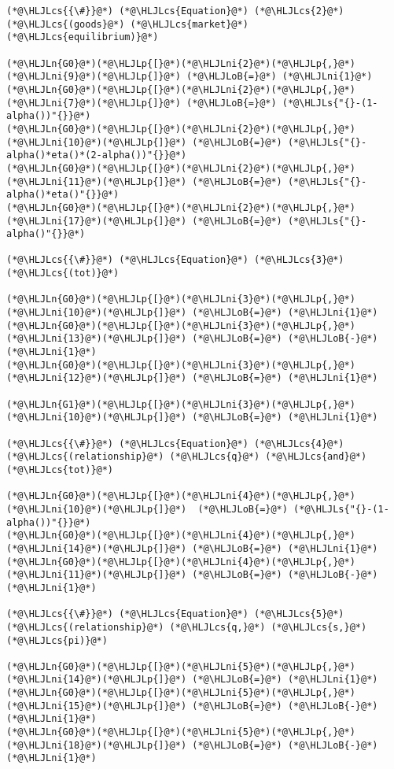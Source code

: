 \documentclass[12pt,a4paper]{article}
\newcommand{\HLJLn}[1]{#1}
\newcommand{\HLJLs}[1]{\textcolor[RGB]{201,61,57}{#1}}
\newcommand{\HLJLni}[1]{\textcolor[RGB]{59,151,46}{#1}}
\newcommand{\HLJLoB}[1]{\textcolor[RGB]{102,102,102}{\textbf{#1}}}
\newcommand{\HLJLp}[1]{#1}
\newcommand{\HLJLcs}[1]{\textcolor[RGB]{153,153,119}{\textit{#1}}}
\begin{document}
\begin{lstlisting}
(*@\HLJLcs{{\#}}@*) (*@\HLJLcs{Equation}@*) (*@\HLJLcs{2}@*) (*@\HLJLcs{(goods}@*) (*@\HLJLcs{market}@*) (*@\HLJLcs{equilibrium)}@*)

(*@\HLJLn{G0}@*)(*@\HLJLp{[}@*)(*@\HLJLni{2}@*)(*@\HLJLp{,}@*)(*@\HLJLni{9}@*)(*@\HLJLp{]}@*) (*@\HLJLoB{=}@*) (*@\HLJLni{1}@*)
(*@\HLJLn{G0}@*)(*@\HLJLp{[}@*)(*@\HLJLni{2}@*)(*@\HLJLp{,}@*)(*@\HLJLni{7}@*)(*@\HLJLp{]}@*) (*@\HLJLoB{=}@*) (*@\HLJLs{"{}-(1-alpha())"{}}@*)
(*@\HLJLn{G0}@*)(*@\HLJLp{[}@*)(*@\HLJLni{2}@*)(*@\HLJLp{,}@*)(*@\HLJLni{10}@*)(*@\HLJLp{]}@*) (*@\HLJLoB{=}@*) (*@\HLJLs{"{}-alpha()*eta()*(2-alpha())"{}}@*)
(*@\HLJLn{G0}@*)(*@\HLJLp{[}@*)(*@\HLJLni{2}@*)(*@\HLJLp{,}@*)(*@\HLJLni{11}@*)(*@\HLJLp{]}@*) (*@\HLJLoB{=}@*) (*@\HLJLs{"{}-alpha()*eta()"{}}@*)
(*@\HLJLn{G0}@*)(*@\HLJLp{[}@*)(*@\HLJLni{2}@*)(*@\HLJLp{,}@*)(*@\HLJLni{17}@*)(*@\HLJLp{]}@*) (*@\HLJLoB{=}@*) (*@\HLJLs{"{}-alpha()"{}}@*)

(*@\HLJLcs{{\#}}@*) (*@\HLJLcs{Equation}@*) (*@\HLJLcs{3}@*) (*@\HLJLcs{(tot)}@*)

(*@\HLJLn{G0}@*)(*@\HLJLp{[}@*)(*@\HLJLni{3}@*)(*@\HLJLp{,}@*)(*@\HLJLni{10}@*)(*@\HLJLp{]}@*) (*@\HLJLoB{=}@*) (*@\HLJLni{1}@*)
(*@\HLJLn{G0}@*)(*@\HLJLp{[}@*)(*@\HLJLni{3}@*)(*@\HLJLp{,}@*)(*@\HLJLni{13}@*)(*@\HLJLp{]}@*) (*@\HLJLoB{=}@*) (*@\HLJLoB{-}@*)(*@\HLJLni{1}@*)
(*@\HLJLn{G0}@*)(*@\HLJLp{[}@*)(*@\HLJLni{3}@*)(*@\HLJLp{,}@*)(*@\HLJLni{12}@*)(*@\HLJLp{]}@*) (*@\HLJLoB{=}@*) (*@\HLJLni{1}@*)

(*@\HLJLn{G1}@*)(*@\HLJLp{[}@*)(*@\HLJLni{3}@*)(*@\HLJLp{,}@*)(*@\HLJLni{10}@*)(*@\HLJLp{]}@*) (*@\HLJLoB{=}@*) (*@\HLJLni{1}@*)

(*@\HLJLcs{{\#}}@*) (*@\HLJLcs{Equation}@*) (*@\HLJLcs{4}@*) (*@\HLJLcs{(relationship}@*) (*@\HLJLcs{q}@*) (*@\HLJLcs{and}@*) (*@\HLJLcs{tot)}@*)

(*@\HLJLn{G0}@*)(*@\HLJLp{[}@*)(*@\HLJLni{4}@*)(*@\HLJLp{,}@*)(*@\HLJLni{10}@*)(*@\HLJLp{]}@*)  (*@\HLJLoB{=}@*) (*@\HLJLs{"{}-(1-alpha())"{}}@*)
(*@\HLJLn{G0}@*)(*@\HLJLp{[}@*)(*@\HLJLni{4}@*)(*@\HLJLp{,}@*)(*@\HLJLni{14}@*)(*@\HLJLp{]}@*) (*@\HLJLoB{=}@*) (*@\HLJLni{1}@*)
(*@\HLJLn{G0}@*)(*@\HLJLp{[}@*)(*@\HLJLni{4}@*)(*@\HLJLp{,}@*)(*@\HLJLni{11}@*)(*@\HLJLp{]}@*) (*@\HLJLoB{=}@*) (*@\HLJLoB{-}@*)(*@\HLJLni{1}@*)

(*@\HLJLcs{{\#}}@*) (*@\HLJLcs{Equation}@*) (*@\HLJLcs{5}@*) (*@\HLJLcs{(relationship}@*) (*@\HLJLcs{q,}@*) (*@\HLJLcs{s,}@*) (*@\HLJLcs{pi)}@*)

(*@\HLJLn{G0}@*)(*@\HLJLp{[}@*)(*@\HLJLni{5}@*)(*@\HLJLp{,}@*)(*@\HLJLni{14}@*)(*@\HLJLp{]}@*) (*@\HLJLoB{=}@*) (*@\HLJLni{1}@*)
(*@\HLJLn{G0}@*)(*@\HLJLp{[}@*)(*@\HLJLni{5}@*)(*@\HLJLp{,}@*)(*@\HLJLni{15}@*)(*@\HLJLp{]}@*) (*@\HLJLoB{=}@*) (*@\HLJLoB{-}@*)(*@\HLJLni{1}@*)
(*@\HLJLn{G0}@*)(*@\HLJLp{[}@*)(*@\HLJLni{5}@*)(*@\HLJLp{,}@*)(*@\HLJLni{18}@*)(*@\HLJLp{]}@*) (*@\HLJLoB{=}@*) (*@\HLJLoB{-}@*)(*@\HLJLni{1}@*)


\end{lstlisting}
\end{document}
